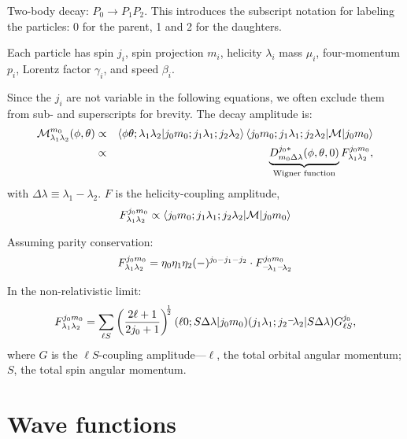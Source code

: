 \documentclass[a4paper]{article}
\newcommand{\raisedminus}[3]{\raisebox{#1}{$#2{-}$}\hspace{#3}}
\newcommand{\unaryminus}{%
  \mathchoice{%
    \raisedminus{0.25em}{\scriptstyle}{-0.15em}%
  }{%
    \raisedminus{0.25em}{\scriptstyle}{-0.15em}%
  }{%
    \raisedminus{0.1em}{\scriptstyle}{-0.15em}%
  }{%
    \raisedminus{0.1em}{\scriptstyle}{-0.15em}%
  }%
}
\newcommand{\decay}[2]{\ensuremath{#1\to#2}}
\begin{document}
Two-body decay: \decay{P_0}{P_1P_2}. This
introduces the subscript notation for labeling the particles: 0
for the parent, 1 and 2 for the daughters.

Each particle has spin $j_i$, spin projection $m_i$, helicity $\lambda_i$
mass $\mu_i$, four-momentum $p_i$, Lorentz factor $\gamma_i$, and speed $\beta_i$.

Since the $j_i$ are not variable in the following equations, we often
exclude them from sub- and superscripts for brevity. The decay
amplitude is:
\begin{eqnarray*}
  \mathcal{M}^{m_0}_{\lambda_1\lambda_2}(\phi,\theta) & \propto &
  \braket{\phi\theta;\lambda_1\lambda_2|j_0m_0;j_1\lambda_1;j_2\lambda_2}\braket{j_0m_0;j_1\lambda_1;j_2\lambda_2|\mathcal{M}|j_0m_0}\\
  & \propto & \underbrace{D^{j_0*}_{m_0\Delta \lambda}(\phi,\theta,0)}_{\textrm{Wigner function}}
  F^{j_0m_0}_{\lambda_1\lambda_2},
\end{eqnarray*}
with $\Delta\lambda \equiv \lambda_1 - \lambda_2$. $F$ is the helicity-coupling amplitude,
\[
F^{j_0m_0}_{\lambda_1\lambda_2} \propto \braket{j_0m_0;j_1\lambda_1;j_2\lambda_2|\mathcal{M}|j_0m_0}
\]

Assuming parity conservation:
\[
F^{j_0m_0}_{\lambda_1\lambda_2} = \eta_0\eta_1\eta_2(-)^{j_0-j_1-j_2} \cdot F^{j_0m_0}_{\unaryminus\lambda_1\unaryminus\lambda_2}
\]

In the non-relativistic limit:
\[
F^{j_0m_0}_{\lambda_1\lambda_2} = \sum_{\ell S} \left(\frac{2\ell+1}{2j_0+1}\right)^{\!\!\frac{1}{2}}
(\ell0;S\Delta \lambda | j_0 m_0) (j_1\lambda_1;j_2\unaryminus\lambda_2|S\Delta\lambda)
G^{j_0}_{\ell S},
\]
where $G$ is the $\ell S$-coupling amplitude---$\ell$, the total orbital
angular momentum; $S$, the total spin angular momentum.


\section{Wave functions}
\end{document}
